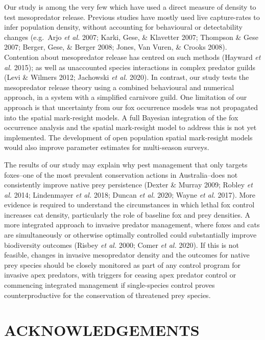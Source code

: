 \documentclass[]{elsarticle} %
\begin{document}
Our study is among the very few which have used a direct measure of density to test mesopredator release. Previous studies have mostly used live capture-rates to infer population density, without accounting for behavioural or detectability changes (e.g.~Arjo \emph{et al.} 2007; Karki, Gese, \& Klavetter 2007; Thompson \& Gese 2007; Berger, Gese, \& Berger 2008; Jones, Van Vuren, \& Crooks 2008). Contention about mesopredator release has centred on such methods (Hayward \emph{et al.} 2015); as well as unaccounted species interactions in complex predator guilds (Levi \& Wilmers 2012; Jachowski \emph{et al.} 2020). In contrast, our study tests the mesopredator release theory using a combined behavioural and numerical approach, in a system with a simplified carnivore guild. One limitation of our approach is that uncertainty from our fox occurrence models was not propagated into the spatial mark-resight models. A full Bayesian integration of the fox occurrence analysis and the spatial mark-resight model to address this is not yet implemented. The development of open population spatial mark-resight models would also improve parameter estimates for multi-season surveys.

The results of our study may explain why pest management that only targets foxes--one of the most prevalent conservation actions in Australia--does not consistently improve native prey persistence (Dexter \& Murray 2009; Robley \emph{et al.} 2014; Lindenmayer \emph{et al.} 2018; Duncan \emph{et al.} 2020; Wayne \emph{et al.} 2017). More evidence is required to understand the circumstances in which lethal fox control increases cat density, particularly the role of baseline fox and prey densities. A more integrated approach to invasive predator management, where foxes and cats are simultaneously or otherwise optimally controlled could substantially improve biodiversity outcomes (Risbey \emph{et al.} 2000; Comer \emph{et al.} 2020). If this is not feasible, changes in invasive mesopredator density and the outcomes for native prey species should be closely monitored as part of any control program for invasive apex predators, with triggers for ceasing apex predator control or commencing integrated management if single-species control proves counterproductive for the conservation of threatened prey species.

\newpage

\hypertarget{acknowledgements}{%
\section*{ACKNOWLEDGEMENTS}\label{acknowledgements}}
\end{document}
